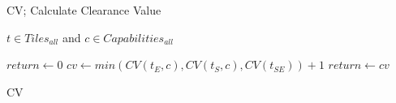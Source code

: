 \begin{algorithm}
\caption{CV; Calculate Clearance Value}
\label{aha-alg:calculateclearance}
\begin{algorithmic}
\REQUIRE $t \in Tiles_{all}$ and $c \in Capabilities_{all}$

	 \STATE $return \leftarrow 0$  \ENDIF
	\STATE $cv \leftarrow min(CV(t_{E}, c), CV(t_{S}, c), CV(t_{SE})) + 1$
	\STATE $return \leftarrow cv$


\caption{CV}
\label{alg_ccv}
\end{algorithmic}
\end{algorithm}
